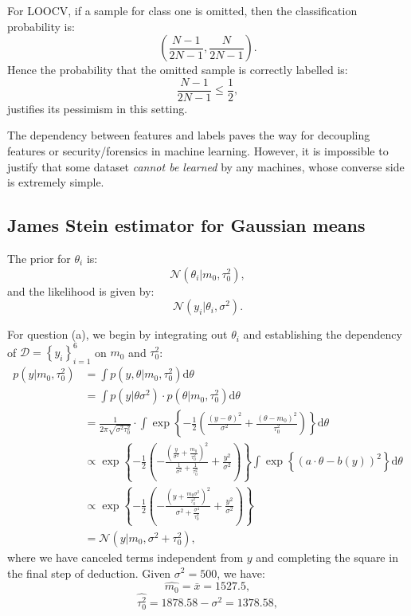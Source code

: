 \documentclass[UTF8]{ctexart}
\begin{document}
For LOOCV, if a sample for class one is omitted, then the classification probability is:
$$(\frac{N-1}{2N-1},\frac{N}{2N-1}).$$
Hence the probability that the omitted sample is correctly labelled is:
$$\frac{N-1}{2N-1}\leq \frac{1}{2},$$
justifies its pessimism in this setting.

The dependency between features and labels paves the way for decoupling features or security/forensics in machine learning.
However, it is impossible to justify that some dataset \emph{cannot be learned} by any machines, whose converse side is extremely simple.

\subsection{James Stein estimator for Gaussian means}
The prior for $\theta_{i}$ is:
$$\mathcal{N}(\theta_{i}|m_{0},\tau_{0}^{2}),$$
and the likelihood is given by:
$$\mathcal{N}(y_{i}|\theta_{i},\sigma^{2}).$$

For question (a), we begin by integrating out $\theta_{i}$ and establishing the dependency of $\mathcal{D}=\left\{y_{i} \right\}_{i=1}^{6}$ on $m_{0}$ and $\tau_{0}^{2}$:
$$
\begin{aligned}
p(y|m_{0},\tau_{0}^{2})&=\int p(y,\theta|m_{0},\tau_{0}^{2})\text{d}\theta \\
&=\int p(y|\theta\sigma^{2})\cdot p(\theta|m_{0},\tau_{0}^{2})\text{d}\theta \\
&= \frac{1}{2\pi\sqrt{\sigma^{2}\tau_{0}^{2}}}\cdot\int \exp\left\{-\frac{1}{2}\left( \frac{(y-\theta)^{2}}{\sigma^{2}}+\frac{(\theta-m_{0})^{2}}{\tau_{0}^{2}}\right) \right\}\text{d}\theta\\
&\propto\exp\left\{-\frac{1}{2}\left(-\frac{(\frac{y}{\sigma^{2}}+\frac{m_{0}}{\tau_{0}^{2}})^{2}}{\frac{1}{\sigma^{2}}+\frac{1}{\tau_{0}^{2}}}+\frac{y^{2}}{\sigma^{2}}\right) \right\} \int\exp\left\{(a\cdot\theta-b(y))^{2} \right\}\text{d}\theta\\
&\propto \exp\left\{-\frac{1}{2}\left( -\frac{(y+\frac{m_{0}\sigma^{2}}{\tau_{0}^{2}})^{2}}{\sigma^{2}+\frac{\sigma^{4}}{\tau_{0}^{2}}}+\frac{y^{2}}{\sigma^{2}} \right)\right\}\\
&=\mathcal{N}\left(y|m_{0},\sigma^{2}+\tau_{0}^{2}\right),
\end{aligned}
$$
where we have canceled terms independent from $y$ and completing the square in the final step of deduction.
Given $\sigma^{2}=500$, we have:
$$\hat{m_{0}}=\bar{x}=1527.5,$$
$$\hat{\tau_{0}^{2}}=1878.58-\sigma^{2}=1378.58,$$
\end{document}
